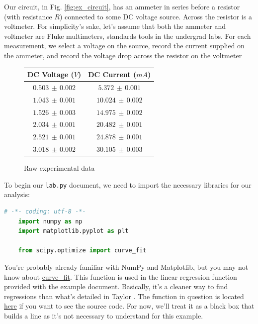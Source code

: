 \documentclass[12pt]{article}
\begin{document}
{Our circuit, in Fig. \ref{fig:ex_circuit}, has an ammeter in series before a resistor (with resistance $R$) connected to some DC voltage source. Across the resistor is a voltmeter. For simplicity's sake, let's assume that both the ammeter and voltmeter are Fluke multimeters, standards tools in the undergrad labs. For each measurement, we select a voltage on the source, record the current supplied on the ammeter, and record the voltage drop across the resistor on the voltmeter

\begin{figure}[!ht]
  \centering
  \begin{tabular}{c | c}
    DC Voltage ($V$) & DC Current ($mA$) \\\hline
    $0.503\,\pm\,0.002$ & $5.372\,\pm\,0.001$ \\
    $1.043\,\pm\,0.001$ & $10.024\,\pm\,0.002$ \\
    $1.526\,\pm\,0.003$ & $14.975\,\pm\,0.002$ \\
    $2.034\,\pm\,0.001$ & $20.482\,\pm\,0.001$ \\
    $2.521\,\pm\,0.001$ & $24.878\,\pm\,0.001$ \\
    $3.018\,\pm\,0.002$ & $30.105\,\pm\,0.003$
  \end{tabular}
  \caption{\textsf{Raw experimental data}}
  \label{tab:ex_exprdata}
\end{figure}

To begin our \texttt{lab.py} document, we need to import the necessary libraries for our analysis:
\begin{framed}
  \begin{lstlisting}[language=Python]
    # -*- coding: utf-8 -*-
    import numpy as np
    import matplotlib.pyplot as plt

    from scipy.optimize import curve_fit
  \end{lstlisting}
\end{framed}

You're probably already familiar with NumPy and Matplotlib, but you may not know about \href{http://bit.ly/2qUN5Ci}{curve\_fit}. This function is used in the linear regression function provided with the example document. Basically, it's a cleaner way to find regressions than what's detailed in Taylor \cite{taylor_error}. The function in question is located \href{http://bit.ly/2pe8JEq}{here} if you want to see the source code. For now, we'll treat it as a black box that builds a line as it's not necessary to understand for this example.

}
\end{document}
